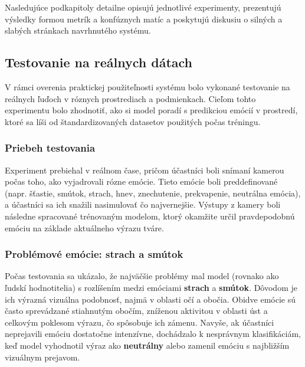 Nasledujúce podkapitoly detailne opisujú jednotlivé experimenty, prezentujú výsledky formou metrík a konfúznych matíc a poskytujú diskusiu o silných a slabých stránkach navrhnutého systému.
\subsection{Testovanie na re\'alnych d\'atach}

V r\'amci overenia praktickej pou\v{z}ite\v{l}nosti syst\'emu bolo vykonan\'e testovanie na re\'alnych \v{l}u\v{d}och v r\'oznych prostrediach a podmienkach. Cie\v{l}om tohto experimentu bolo zhodnoti\v{t}, ako si model porad\'i s predikciou em\'oci\'i v prostred\'i, ktor\'e sa l\'i\v{s}i od \v{s}tandardizovan\'ych datasetov pou\v{z}it\'ych po\v{c}as tr\'eningu.

\subsubsection{Priebeh testovania}
Experiment prebiehal v re\'alnom \v{c}ase, pri\v{c}om \'u\v{c}astn\'ici boli sn\'iman\'i kamerou po\v{c}as toho, ako vyjadrovali r\'ozne em\'ocie. Tieto em\'ocie boli preddefinovan\'e (napr. \v{s}\v{t}astie, sm\'utok, strach, hnev, znechutenie, prekvapenie, neutr\'alna em\'ocia), a \'u\v{c}astn\'ici sa ich sna\v{z}ili nasimulova\v{t} \v{c}o najvernej\v{s}ie. V\'ystupy z kamery boli n\'asledne spracovan\'e tr\'enovan\'ym modelom, ktor\'y okam\v{z}ite ur\v{c}il pravdepodobn\'u em\'ociu na z\'aklade aktu\'alneho v\'yrazu tv\'are.

\subsubsection{Probl\'emov\'e em\'ocie: strach a sm\'utok}
Po\v{c}as testovania sa uk\'azalo, \v{z}e najv\"a\v{c}\v{s}ie probl\'emy mal model (rovnako ako \v{l}udsk\'i hodnotitelia) s rozl\'i\v{s}en\'im medzi em\'ociami \textbf{strach} a \textbf{sm\'utok}. D\^ovodom je ich v\'yrazn\'a vizu\'alna podobnos\v{t}, najm\"a v oblasti o\v{c}\'i a obo\v{c}ia. Obidve em\'ocie s\'u \v{c}asto sprev\'adzan\'e stiahnut\'ym obo\v{c}\'im, zn\'i\v{z}enou aktivitou v oblasti \'ust a celkov\'ym poklesom v\'yrazu, \v{c}o sp\^osobuje ich z\'amenu. Navy\v{s}e, ak \'u\v{c}astn\'ici neprejavili em\'ociu dostato\v{c}ne intenz\'ivne, doch\'adzalo k nespr\'avnym klasifik\'aci\'am, ke\v{d} model vyhodnotil v\'yraz ako \textbf{neutr\'alny} alebo zamenil em\'ociu s najbli\v{z}\v{s}\'im vizu\'alnym prejavom.

